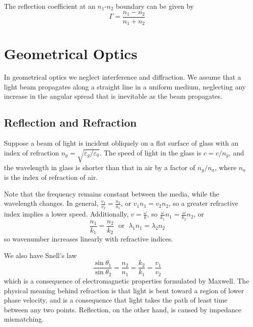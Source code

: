 \documentclass[12pt, a4paper, oneside, openright, titlepage]{book}
\begin{document}
The reflection coefficient at an $n_1$-$n_2$ boundary can be given by
\begin{equation*}
    \Gamma = \frac{n_1-n_2}{n_1+n_2}
\end{equation*}













\section{Geometrical Optics}

In geometrical optics we neglect interference and diffraction. We assume that a light beam propagates along a straight line in a uniform medium, neglecting any increase in the angular spread that is inevitable as the beam propagates. 


\subsection{Reflection and Refraction}

Suppose a beam of light is incident obliquely on a flat surface of glass with an index of refraction $n_g = \sqrt{\varepsilon_g/\varepsilon_0}$. The speed of light in the glass is $c = c/n_g$, and the wavelength in glass is shorter than that in air by a factor of $n_g/n_a$, where $n_a$ is the index of refraction of air.

\begin{rmk}
    Note that the frequency remains constant between the media, while the wavelength changes. In general, $\frac{v_1}{v_2} = \frac{n_2}{n_1}$, or $v_1n_1 = v_2n_2$, so a greater refractive index implies a lower speed. Additionally, $v = \frac{\omega}{k}$, so $\frac{\omega}{k_1}n_1 = \frac{\omega}{k_2}n_2$, or 
    \begin{equation*}
        \frac{n_1}{k_1} = \frac{n_2}{k_2}\;\text{ or }\;\lambda_1n_1 = \lambda_2n_2
    \end{equation*}
    so wavenumber increases linearly with refractive indices.
\end{rmk}

We also have Snell's law
\begin{equation*}
    \frac{\sin\theta_1}{\sin\theta_2} = \frac{n_2}{n_1} = \frac{k_2}{k_1} = \frac{v_1}{v_2}
\end{equation*}
which is a consequence of electromagnetic properties formulated by Maxwell. The physical meaning behind refraction is that light is bent toward a region of lower phase velocity, and is a consequence that light takes the path of least time between any two points. Reflection, on the other hand, is caused by impedance mismatching. 
\end{document}
